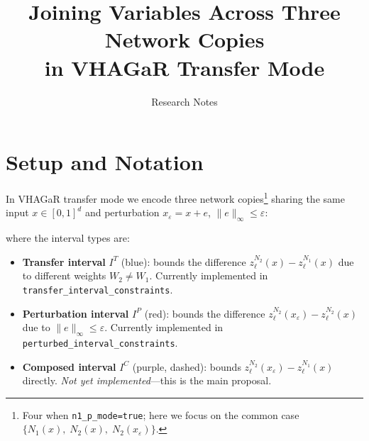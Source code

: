 \documentclass[11pt]{article}
\title{Joining Variables Across Three Network Copies\\in VHAGaR Transfer Mode}
\author{Research Notes}
\date{}
\newcommand{\eps}{\varepsilon}
\newcommand{\layerl}{\ell}
\begin{document}
\maketitle

\section{Setup and Notation}

In VHAGaR transfer mode we encode three network copies\footnote{%
Four when \texttt{n1\_p\_mode=true}; here we focus on the common case
$\{N_1(x),\; N_2(x),\; N_2(x_\varepsilon)\}$.}
sharing the same input $x\in[0,1]^d$ and perturbation
$x_\varepsilon = x + e$, $\|e\|_\infty\le\eps$:

\begin{center}
\end{center}

\noindent
where the interval types are:
\begin{itemize}
    \item \textbf{Transfer interval} $I^T$ (blue): bounds the difference
          $z^{N_2}_\layerl(x) - z^{N_1}_\layerl(x)$ due to different weights $W_2 \ne W_1$.
          Currently implemented in \texttt{transfer\_interval\_constraints}.
    \item \textbf{Perturbation interval} $I^P$ (red): bounds the difference
          $z^{N_2}_\layerl(x_\varepsilon) - z^{N_2}_\layerl(x)$ due to $\|e\|_\infty\le\eps$.
          Currently implemented in \texttt{perturbed\_interval\_constraints}.
    \item \textbf{Composed interval} $I^C$ (purple, dashed): bounds
          $z^{N_2}_\layerl(x_\varepsilon) - z^{N_1}_\layerl(x)$ directly.
          \emph{Not yet implemented}---this is the main proposal.
\end{itemize}
\end{document}
